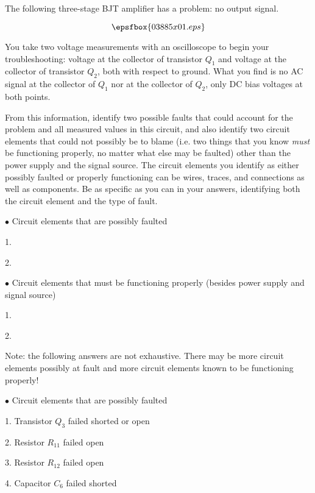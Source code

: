 

The following three-stage BJT amplifier has a problem: no output signal.

$$\epsfbox{03885x01.eps}$$

You take two voltage measurements with an oscilloscope to begin your troubleshooting: voltage at the collector of transistor $Q_1$ and voltage at the collector of transistor $Q_2$, both with respect to ground.  What you find is no AC signal at the collector of $Q_1$ nor at the collector of $Q_2$, only DC bias voltages at both points.

From this information, identify two possible faults that could account for the problem and all measured values in this circuit, and also identify two circuit elements that could not possibly be to blame (i.e. two things that you know {\it must} be functioning properly, no matter what else may be faulted) other than the power supply and the signal source.  The circuit elements you identify as either possibly faulted or properly functioning can be wires, traces, and connections as well as components.  Be as specific as you can in your answers, identifying both the circuit element and the type of fault.

\medskip
\goodbreak
\item{$\bullet$} Circuit elements that are possibly faulted
\item{1.}
\item{2.} 
\medskip

\medskip
\goodbreak
\item{$\bullet$} Circuit elements that must be functioning properly (besides power supply and signal source)
\item{1.} 
\item{2.} 
\medskip







Note: the following answers are not exhaustive.  There may be more circuit elements possibly at fault and more circuit elements known to be functioning properly!

\medskip
\goodbreak
\item{$\bullet$} Circuit elements that are possibly faulted
\item{1.} Transistor $Q_3$ failed shorted or open
\item{2.} Resistor $R_{11}$ failed open
\item{3.} Resistor $R_{12}$ failed open
\item{4.} Capacitor $C_6$ failed shorted
\medskip

